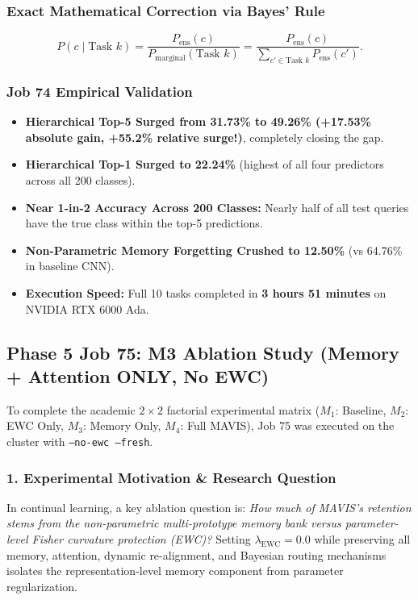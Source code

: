 \documentclass[11pt,a4paper]{article}
\begin{document}
    \subsubsection{Exact Mathematical Correction via Bayes' Rule}
    \begin{equation}
        P(c \mid \text{Task } k) = \frac{P_{\text{ens}}(c)}{P_{\text{marginal}}(\text{Task } k)} = \frac{P_{\text{ens}}(c)}{\sum_{c' \in \text{Task } k} P_{\text{ens}}(c')}.
    \end{equation}
    
    \subsubsection{Job 74 Empirical Validation}
    \begin{itemize}[leftmargin=*]
        \item \textbf{Hierarchical Top-5 Surged from 31.73\% to 49.26\% (+17.53\% absolute gain, +55.2\% relative surge!)}, completely closing the gap.
        \item \textbf{Hierarchical Top-1 Surged to 22.24\%} (highest of all four predictors across all 200 classes).
        \item \textbf{Near 1-in-2 Accuracy Across 200 Classes:} Nearly half of all test queries have the true class within the top-5 predictions.
        \item \textbf{Non-Parametric Memory Forgetting Crushed to 12.50\%} (vs 64.76\% in baseline CNN).
        \item \textbf{Execution Speed:} Full 10 tasks completed in \textbf{3 hours 51 minutes} on NVIDIA RTX 6000 Ada.
    \end{itemize}

    \subsection{Phase 5 Job 75: M3 Ablation Study (Memory + Attention ONLY, No EWC)}
    To complete the academic $2 \times 2$ factorial experimental matrix ($M_1$: Baseline, $M_2$: EWC Only, $M_3$: Memory Only, $M_4$: Full MAVIS), Job 75 was executed on the cluster with \texttt{--no-ewc --fresh}.

    \subsubsection{1. Experimental Motivation \& Research Question}
    In continual learning, a key ablation question is: \textit{How much of MAVIS's retention stems from the non-parametric multi-prototype memory bank versus parameter-level Fisher curvature protection (EWC)?} Setting $\lambda_{\text{EWC}} = 0.0$ while preserving all memory, attention, dynamic re-alignment, and Bayesian routing mechanisms isolates the representation-level memory component from parameter regularization.
\end{document}
